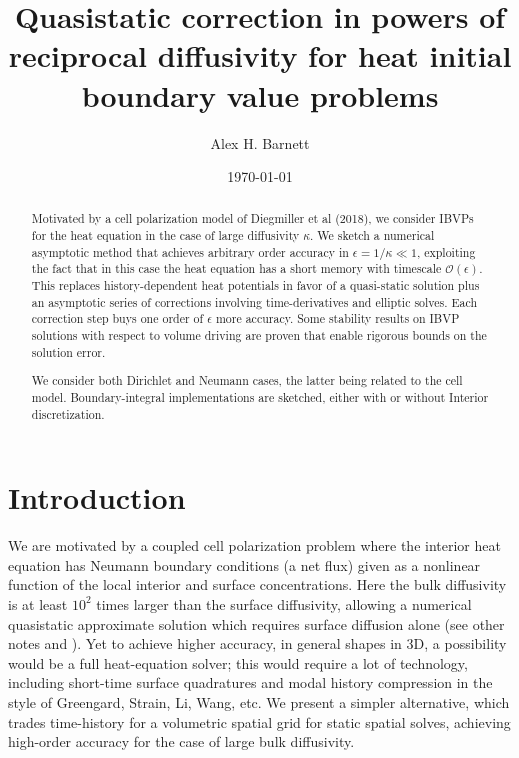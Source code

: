 \documentclass[10pt]{article}
\newcommand{\bigO}{{\mathcal O}}
\newcommand{\eps}{\epsilon}
\begin{document}
\title{Quasistatic correction in powers of reciprocal diffusivity for heat initial boundary value problems}


\author{Alex H. Barnett}
\date{\today}
\maketitle

\begin{abstract}
  Motivated by a cell polarization model of Diegmiller et al (2018),
  we consider IBVPs for the heat equation
  in the case of large diffusivity $\kappa$.
  We sketch a numerical asymptotic method
  that achieves arbitrary order accuracy in $\eps = 1/\kappa \ll 1$,
  exploiting the fact that in this case the heat equation has a short memory
  with timescale $\bigO(\eps)$.
  This replaces history-dependent heat potentials in favor of a
  quasi-static solution plus an asymptotic series of corrections
  involving time-derivatives and elliptic solves.
  Each correction step buys one order of $\eps$ more accuracy.
  Some stability results on IBVP solutions with respect to volume driving
  are proven that enable rigorous bounds on the solution error.

  We consider both Dirichlet and Neumann cases,
  the latter being related to the cell model.
  Boundary-integral implementations are sketched, either with or without
  Interior discretization.
\end{abstract}

\section{Introduction}

We are motivated by a coupled cell polarization problem \cite{diegmiller18}
where the interior heat equation has Neumann boundary conditions
(a net flux) given as a nonlinear function of the local interior and surface concentrations.
Here the bulk diffusivity is at least $10^2$ times larger than the surface diffusivity, allowing a
numerical quasistatic approximate solution which
requires surface diffusion alone (see other notes and \cite{diegmiller18}).
Yet to achieve higher accuracy, in general shapes in 3D,
a possibility would be a full heat-equation solver; this would require
a lot of technology, including short-time surface quadratures and modal history compression in the style of Greengard, Strain, Li, Wang, etc.
We present a simpler alternative, which trades time-history for
a volumetric spatial grid for static spatial solves, achieving high-order
accuracy for the case of large bulk diffusivity.
\end{document}
